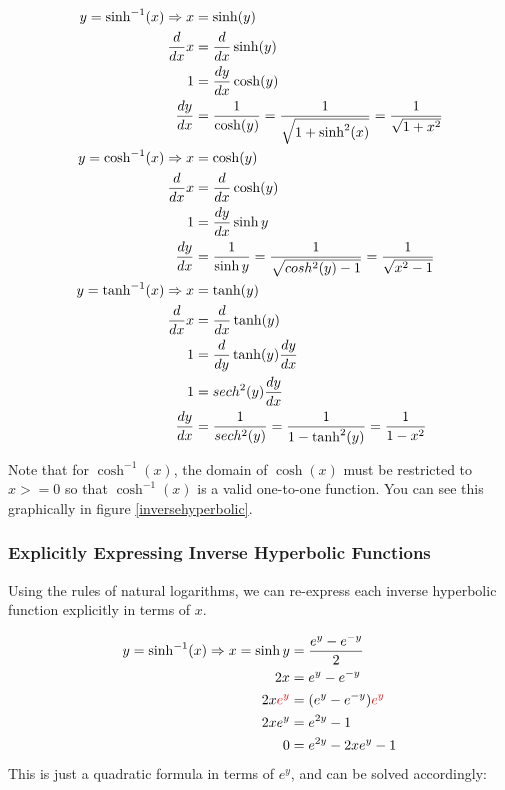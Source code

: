 \documentclass[12pt]{article}
\begin{document}
\begin{equation}
    \begin{split}
        y = \sinh^{-1}(x) \Rightarrow x &= \sinh (y)\\
        \frac{d}{dx} x &= \frac{d}{dx} \sinh(y) \\
        1 &= \frac{dy}{dx} \cosh(y)\\
        \frac{dy}{dx} &= \frac{1}{\cosh(y)} = \frac{1}{\sqrt{1 + \sinh^2(x)}} = \frac{1}{\sqrt{1+x^2}}\\
        y = \cosh^{-1}(x) \Rightarrow x &= \cosh(y)\\
        \frac{d}{dx} x &= \frac{d}{dx} \cosh(y)\\
        1 &= \frac{dy}{dx} \sinh y\\
        \frac{dy}{dx} &= \frac{1}{\sinh y} = \frac{1}{\sqrt{cosh^2(y)-1}} = \frac{1}{\sqrt{x^2-1}}\\
        y = \tanh^{-1}(x) \Rightarrow x &= \tanh(y)\\
        \frac{d}{dx} x &= \frac{d}{dx} \tanh(y)\\
        1 &= \frac{d}{dy} \tanh(y) \frac{dy}{dx}\\
        1 &= sech^2(y) \frac{dy}{dx}\\
        \frac{dy}{dx} &= \frac{1}{sech^2(y)} = \frac{1}{1-\tanh^2(y)} = \frac{1}{1-x^2}
    \end{split}
\end{equation}

Note that for $\cosh^{-1}(x)$, the domain of $\cosh(x)$ must be restricted to $x>=0$ so that $\cosh^{-1}(x)$ is a valid one-to-one function. You can see this graphically in figure \ref{inversehyperbolic}.

\subsubsection{Explicitly Expressing Inverse Hyperbolic Functions}

Using the rules of natural logarithms, we can re-express each inverse hyperbolic function explicitly in terms of $x$.

\begin{equation}
    \begin{split}
        y=\sinh^{-1}(x) \Rightarrow x = \sinh y &= \frac{e^y-e^{-y}}{2}\\
        2x &= e^y-e^{-y}\\
        2x\textcolor{red}{e^y} &= (e^y-e^{-y})\textcolor{red}{e^y}\\
        2xe^y &= e^{2y} - 1\\
        0 &= e^{2y} - 2xe^y -1\\
    \end{split}
\end{equation}
This is just a quadratic formula in terms of $e^y$, and can be solved accordingly:
\end{document}
